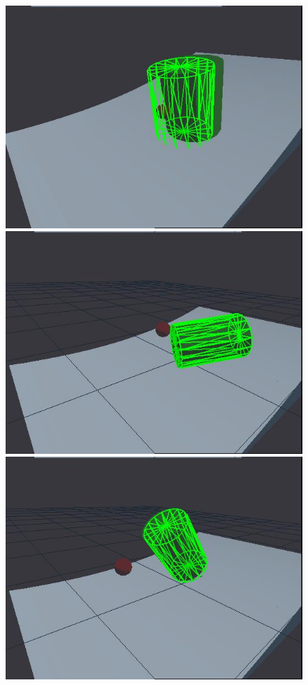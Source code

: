\begin{figure}[htbp]
{}
\centerline{
\includegraphics[width=\imgwid]{./A00250}
\includegraphics[width=\imgwid]{./B00500}
\includegraphics[width=\imgwid]{./C01069}
}
\end{figure}
